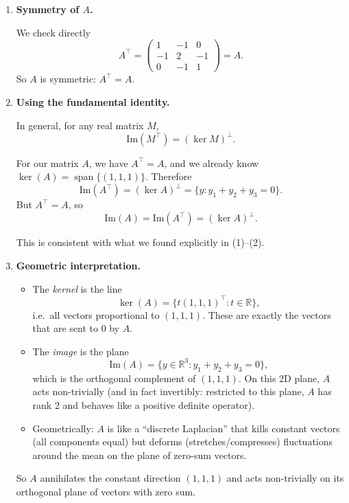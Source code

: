 \documentclass[11pt]{article}
\begin{document}
\begin{enumerate}
Therefore \(\mathrm{Im}(A) \subset (\ker A)^\perp\).  
Since both spaces have dimension 2, we actually have equality:
\[
\mathrm{Im}(A) = (\ker A)^\perp = \{y\in\mathbb{R}^3 : y_1 + y_2 + y_3 = 0\}.
\]

\item \textbf{Symmetry of $A$.}

We check directly
\[
A^\top
=
\begin{pmatrix}
1 & -1 & 0 \\
-1 & 2 & -1 \\
0 & -1 & 1
\end{pmatrix}
= A.
\]
So $A$ is symmetric: $A^\top=A$.

\item \textbf{Using the fundamental identity.}

In general, for any real matrix $M$,
\[
\mathrm{Im}(M^\top) = (\ker M)^\perp.
\]

For our matrix $A$, we have $A^\top = A$, and we already know $\ker(A)=\operatorname{span}\{(1,1,1)\}$. Therefore
\[
\mathrm{Im}(A^\top) = (\ker A)^\perp
= \{y: y_1+y_2+y_3=0\}.
\]
But $A^\top = A$, so
\[
\mathrm{Im}(A) = \mathrm{Im}(A^\top) = (\ker A)^\perp.
\]

This is consistent with what we found explicitly in (1)–(2).

\item \textbf{Geometric interpretation.}

\begin{itemize}
  \item The \emph{kernel} is the line
  \[
  \ker(A) = \{ t(1,1,1)^\top : t\in\mathbb{R}\},
  \]
  i.e.\ all vectors proportional to $(1,1,1)$. These are exactly the vectors that are sent to $0$ by $A$.

  \item The \emph{image} is the plane
  \[
  \mathrm{Im}(A) = \{y\in\mathbb{R}^3 : y_1+y_2+y_3=0\},
  \]
  which is the orthogonal complement of $(1,1,1)$. On this 2D plane, $A$ acts non-trivially (and in fact invertibly: restricted to this plane, $A$ has rank 2 and behaves like a positive definite operator).

  \item Geometrically: $A$ is like a “discrete Laplacian” that kills constant vectors (all components equal) but deforms (stretches/compresses) fluctuations around the mean on the plane of zero-sum vectors.
\end{itemize}

So $A$ annihilates the constant direction $(1,1,1)$ and acts non-trivially on its orthogonal plane of vectors with zero sum.
\end{enumerate}
\end{document}
